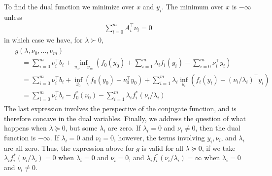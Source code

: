 \documentclass{article}
\begin{document}
To find the dual function we minimize over $x$ and $y_{i}$. The minimum over $x$ is $-\infty$ unless
\begin{align*}
\sum_{i=0}^{m} A_{i}^{\top} \nu_{i}=0
\end{align*}
in which case we have, for $\lambda \succ 0$,
\begin{align*}
\begin{aligned}
&g\left(\lambda, \nu_{0}, \ldots, \nu_{m}\right) \\
&\quad=\sum_{i=0}^{m} \nu_{i}^{\top} b_{i}+\inf _{y_{0}, \ldots, y_{m}}\left(f_{0}\left(y_{0}\right)+\sum_{i=1}^{m} \lambda_{i} f_{i}\left(y_{i}\right)-\sum_{i=0}^{m} \nu_{i}^{\top} y_{i}\right) \\
&\quad=\sum_{i=0}^{m} \nu_{i}^{\top} b_{i}+\inf _{y_{0}}\left(f_{0}\left(y_{0}\right)-\nu_{0}^{\top} y_{0}\right)+\sum_{i=1}^{m} \lambda_{i} \inf _{y_{i}}\left(f_{i}\left(y_{i}\right)-\left(\nu_{i} / \lambda_{i}\right)^{\top} y_{i}\right) \\
&\quad=\sum_{i=0}^{m} \nu_{i}^{\top} b_{i}-f_{0}^{*}\left(\nu_{0}\right)-\sum_{i=1}^{m} \lambda_{i} f_{i}^{*}\left(\nu_{i} / \lambda_{i}\right)
\end{aligned}
\end{align*}
The last expression involves the perspective of the conjugate function, and is therefore concave in the dual variables. Finally, we address the question of what happens when $\lambda \succeq 0$, but some $\lambda_{i}$ are zero. If $\lambda_{i}=0$ and $\nu_{i} \neq 0$, then the dual function is $-\infty$. If $\lambda_{i}=0$ and $\nu_{i}=0$, however, the terms involving $y_{i}, \nu_{i}$, and $\lambda_{i}$ are all zero. Thus, the expression above for $g$ is valid for all $\lambda \succeq 0$, if we take $\lambda_{i} f_{i}^{*}\left(\nu_{i} / \lambda_{i}\right)=0$ when $\lambda_{i}=0$ and $\nu_{i}=0$, and $\lambda_{i} f_{i}^{*}\left(\nu_{i} / \lambda_{i}\right)=\infty$ when $\lambda_{i}=0$ and $\nu_{i} \neq 0$.

\end{document}
